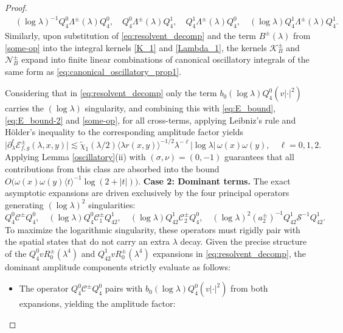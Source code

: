 \documentclass[reqno]{amsart}
\numberwithin{equation}{section}
\begin{document}
\begin{proof}
	\begin{equation} \label{some-op}
		\begin{split}
			& (\log \lambda)^{-1} Q_4^0\Lambda^\pm(\lambda) Q_4^0, \quad Q_4^0 \Lambda^\pm(\lambda) Q_{4}^1, \quad Q_{4}^1 \Lambda^\pm(\lambda) Q_4^0, \quad
			(\log \lambda) Q_{4}^1 \Lambda^\pm(\lambda)Q_{4}^1.
		\end{split}
	\end{equation} 
	Similarly, upon substitution of \eqref{eq:resolvent_decomp} and the term $B^\pm(\lambda)$ from \eqref{some-op} into the integral kernels \eqref{K_1} and \eqref{Lambda_1}, the kernels $\mathcal{K}_B^\pm$ and $\mathcal{N}_B^\pm$ expand into finite linear combinations of canonical oscillatory integrals of the same form as \eqref{eq:canonical_oscillatory_prop1}.

	
	Considering that in \eqref{eq:resolvent_decomp} only the term $b_0 (\log \lambda) Q_4^0(v|\cdot|^2)$ carries the $(\log\lambda)$ singularity, and combining this with \eqref{eq:E_bound}, \eqref{eq:E_bound-2} and \eqref{some-op}, for all cross-terms, applying Leibniz's rule and H\"older's inequality to the corresponding amplitude factor yields
	\[
	\bigl| \partial_\lambda^{\ell} \mathcal{E}_{f,g}^\pm(\lambda,x,y) \bigr| \lesssim \widetilde{\chi}_1(\lambda/2) \langle \lambda r(x,y) \rangle^{-1/2} \lambda^{-\ell} |\log\lambda| \, \omega(x)\omega(y), \quad \ell = 0,1,2.
	\]
Applying Lemma \ref{oscillatory}(ii) with $(\sigma,\nu)=(0,-1)$ guarantees that all contributions from this class are  absorbed into the  bound ${O}\bigl(\omega(x)\omega(y)\langle t \rangle^{-1}\log(2+|t|)\bigr)$.
	\vskip0.2cm
	\textbf{Case 2: Dominant terms.} 
	The exact asymptotic expansions are driven exclusively by the four principal operators generating $(\log\lambda)^2$ singularities:
	\[
	Q_4^0\mathcal{C}^\pm Q_4^0, \quad (\log \lambda)Q_4^0 \mathcal{C}_1^\pm Q_{42}^1, \quad (\log \lambda)Q_{42}^1 \mathcal{C}_2^\pm Q_4^0, \quad (\log \lambda)^2 (a_2^\pm)^{-1} Q_{42}^1 \mathcal{S}^{-1} Q_{42}^1.
	\]
	To maximize the logarithmic singularity, these operators must rigidly pair with the spatial states that do not carry an extra $\lambda$ decay. Given the precise structure of the $Q_4^0v R_0^\pm(\lambda^4)$ and $Q_{42}^1v R_0^\pm(\lambda^4)$ expansions in \eqref{eq:resolvent_decomp}, the dominant amplitude  components strictly evaluate as follows:
	\begin{itemize}
		\item The operator $Q_4^0\mathcal{C}^\pm Q_4^0$ pairs with $b_0(\log\lambda)Q_4^0(v |\cdot|^2)$ from both expansions, yielding the amplitude factor:

\end{itemize}
\end{proof}
\end{document}
